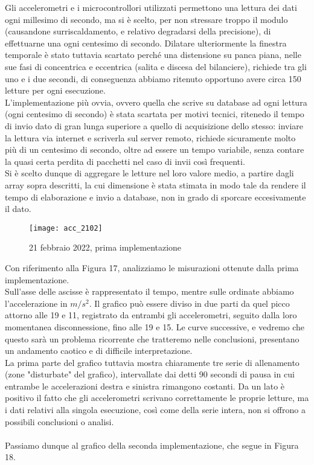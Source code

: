\documentclass[fleqn,10pt]{SelfArx} %
\begin{document}
Gli accelerometri e i microcontrollori utilizzati permettono una lettura dei dati ogni millesimo di secondo, ma 
si è scelto, per non stressare troppo il modulo (causandone surriscaldamento, e relativo degradarsi della 
precisione), di effettuarne una ogni centesimo di secondo. Dilatare ulteriormente la finestra temporale è stato 
tuttavia scartato perché una distensione su panca piana, nelle sue fasi di concentrica e eccentrica (salita e 
discesa del bilanciere), richiede tra gli uno e i due secondi, di conseguenza abbiamo ritenuto opportuno 
avere circa 150 letture per ogni esecuzione.\\
L'implementazione più ovvia, ovvero quella che scrive su database ad ogni lettura (ogni 
centesimo di secondo) è stata scartata per motivi tecnici, ritenedo il tempo di invio dato di gran lunga superiore 
a quello di acquisizione dello stesso: inviare la lettura via internet e scriverla sul server remoto, richiede 
sicuramente molto più di un centesimo di secondo, oltre ad essere un tempo variabile, senza contare la quasi certa 
perdita di pacchetti nel caso di invii così frequenti.\\

Si è scelto dunque di aggregare le letture nel loro valore medio, a partire dagli array sopra descritti, 
la cui dimensione è stata stimata in modo tale da rendere il tempo di elaborazione e invio a database, non in grado 
di sporcare eccesivamente il dato.

\begin{figure}[htb]\centering
	\texttt{[image: acc\_2102]}
	\caption{21 febbraio 2022, prima implementazione}
	\label{fig:accelerazione 2102}
\end{figure}

Con riferimento alla Figura 17, analizziamo le misurazioni ottenute dalla prima implementazione.\\
Sull'asse delle ascisse è rappresentato il tempo, mentre sulle ordinate abbiamo l'accelerazione in $ m/s^2 $.
Il grafico può essere diviso in due parti da quel picco attorno alle 19 e 11, registrato da entrambi gli accelerometri,
seguito dalla loro momentanea disconnessione, fino alle 19 e 15. Le curve successive, e vedremo che questo sarà un 
problema ricorrente che tratteremo nelle conclusioni, presentano un andamento caotico e di difficile interpretazione.\\
La prima parte del grafico tuttavia mostra chiaramente tre serie di allenamento (zone "disturbate" del grafico), 
intervallate dai detti 90 secondi di pausa in cui entrambe le accelerazioni destra e sinistra rimangono costanti.
Da un lato è positivo il fatto che gli accelerometri scrivano correttamente le proprie letture, ma i dati relativi alla 
singola esecuzione, così come della serie intera, non si offrono a possibili conclusioni o analisi.\\
\\
Passiamo dunque al grafico della seconda implementazione, che segue in Figura 18.
\end{document}
